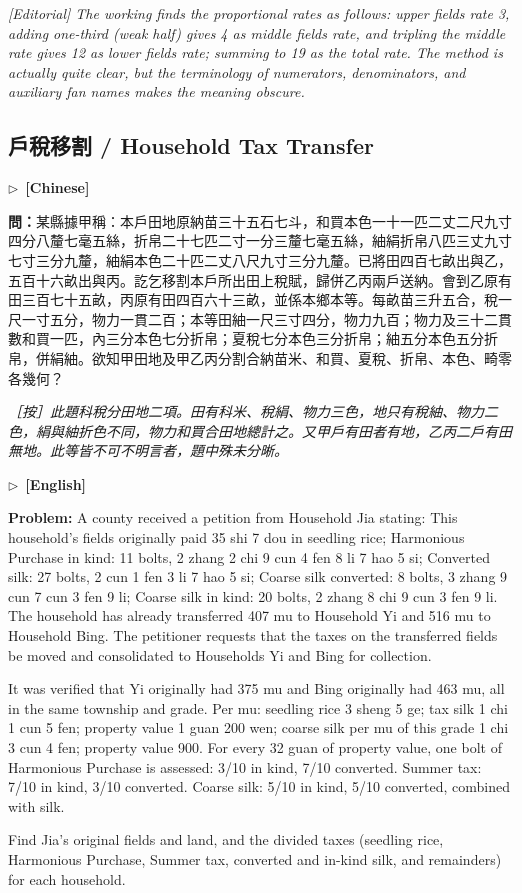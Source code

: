 \documentclass[10pt,a4paper]{article}
\newcommand{\CNmarker}{\noindent\textcolor{cnlabel}{$\triangleright$\ \textbf{[Chinese]}}\par}
\newcommand{\ENmarker}{\noindent\textcolor{enlabel}{$\triangleright$\ \textbf{[English]}}\par}
\newcommand{\Question}[1]{\par\noindent\textbf{\color{problemcolor}問：}#1\par}
\newcommand{\EditorialNote}[1]{\par\noindent\textit{［按］#1}\par}
\newcommand{\QuestionEn}[1]{\par\noindent\textbf{\color{problemcolor}Problem:} #1\par}
\newcommand{\EditorialNoteEn}[1]{\par\noindent\textit{[Editorial] #1}\par}
\begin{document}
\EditorialNoteEn{The working finds the proportional rates as follows: upper fields rate 3, adding one-third (weak half) gives 4 as middle fields rate, and tripling the middle rate gives 12 as lower fields rate; summing to 19 as the total rate. The method is actually quite clear, but the terminology of numerators, denominators, and auxiliary \textit{fan} names makes the meaning obscure.}


\newpage
\subsection*{戶稅移割 / Household Tax Transfer}

\CNmarker
\Question{某縣據甲稱：本戶田地原納苗三十五石七斗，和買本色一十一匹二丈二尺九寸四分八釐七毫五絲，折帛二十七匹二寸一分三釐七毫五絲，紬絹折帛八匹三丈九寸七寸三分九釐，紬絹本色二十匹二丈八尺九寸三分九釐。已將田四百七畝出與乙，五百十六畝出與丙。訖乞移割本戶所出田上稅賦，歸併乙丙兩戶送納。會到乙原有田三百七十五畝，丙原有田四百六十三畝，並係本鄉本等。每畝苗三升五合，稅一尺一寸五分，物力一貫二百；本等田紬一尺三寸四分，物力九百；物力及三十二貫數和買一匹，內三分本色七分折帛；夏稅七分本色三分折帛；紬五分本色五分折帛，併絹紬。欲知甲田地及甲乙丙分割合納苗米、和買、夏稅、折帛、本色、畸零各幾何？}

\EditorialNote{此題科稅分田地二項。田有科米、稅絹、物力三色，地只有稅紬、物力二色，絹與紬折色不同，物力和買合田地總計之。又甲戶有田者有地，乙丙二戶有田無地。此等皆不可不明言者，題中殊未分晰。}

\ENmarker
\QuestionEn{A county received a petition from Household Jia stating: This household's fields originally paid 35 shi 7 dou in seedling rice; Harmonious Purchase in kind: 11 bolts, 2 zhang 2 chi 9 cun 4 fen 8 li 7 hao 5 si; Converted silk: 27 bolts, 2 cun 1 fen 3 li 7 hao 5 si; Coarse silk converted: 8 bolts, 3 zhang 9 cun 7 cun 3 fen 9 li; Coarse silk in kind: 20 bolts, 2 zhang 8 chi 9 cun 3 fen 9 li. The household has already transferred 407 mu to Household Yi and 516 mu to Household Bing. The petitioner requests that the taxes on the transferred fields be moved and consolidated to Households Yi and Bing for collection.

It was verified that Yi originally had 375 mu and Bing originally had 463 mu, all in the same township and grade. Per mu: seedling rice 3 sheng 5 ge; tax silk 1 chi 1 cun 5 fen; property value 1 guan 200 wen; coarse silk per mu of this grade 1 chi 3 cun 4 fen; property value 900. For every 32 guan of property value, one bolt of Harmonious Purchase is assessed: 3/10 in kind, 7/10 converted. Summer tax: 7/10 in kind, 3/10 converted. Coarse silk: 5/10 in kind, 5/10 converted, combined with silk.

Find Jia's original fields and land, and the divided taxes (seedling rice, Harmonious Purchase, Summer tax, converted and in-kind silk, and remainders) for each household.}
\end{document}
